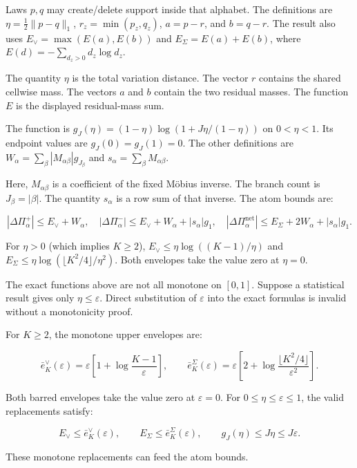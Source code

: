 \documentclass[
  11pt,
  a4paper,
]{article}
\begin{document}
Laws \(p,q\) may create/delete support inside that alphabet. The
definitions are \(\eta=\frac12\lVert p-q\rVert_1\),
\(r_z=\min(p_z,q_z)\), \(a=p-r\), and \(b=q-r\). The result also uses
\(E_\vee=\max(E(a),E(b))\) and \(E_\Sigma=E(a)+E(b)\), where
\(E(d)=-\sum_{d_z>0}d_z\log d_z\).

The quantity \(\eta\) is the total variation distance. The vector \(r\)
contains the shared cellwise mass. The vectors \(a\) and \(b\) contain
the two residual masses. The function \(E\) is the displayed
residual-mass sum.

The function is \(g_J(\eta)=(1-\eta)\log(1+J\eta/(1-\eta))\) on
\(0<\eta<1\). Its endpoint values are \(g_J(0)=g_J(1)=0\). The other
definitions are \(W_\alpha=\sum_\beta|M_{\alpha\beta}|g_{J_\beta}\) and
\(s_\alpha=\sum_\beta M_{\alpha\beta}\).

Here, \(M_{\alpha\beta}\) is a coefficient of the fixed Möbius inverse.
The branch count is \(J_\beta=|\beta|\). The quantity \(s_\alpha\) is a
row sum of that inverse. The atom bounds are:

\[
|\Delta\Pi_\alpha^+|\le E_\vee+W_\alpha,\quad
|\Delta\Pi_\alpha^-|\le E_\vee+W_\alpha+|s_\alpha|g_1,\quad
|\Delta\Pi_\alpha^{\mathrm{net}}|\le E_\Sigma+2W_\alpha+|s_\alpha|g_1.
\]

For \(\eta>0\) (which implies \(K\ge2\)),
\(E_\vee\le\eta\log((K-1)/\eta)\) and
\(E_\Sigma\le\eta\log(\lfloor K^2/4\rfloor/\eta^2)\). Both envelopes
take the value zero at \(\eta=0\).

The exact functions above are not all monotone on \([0,1]\). Suppose a
statistical result gives only \(\eta\le\varepsilon\). Direct
substitution of \(\varepsilon\) into the exact formulas is invalid
without a monotonicity proof.


For \(K\ge2\), the monotone upper envelopes are:

\[
\bar e_K^\vee(\varepsilon)
=\varepsilon\left[1+\log\frac{K-1}{\varepsilon}\right],
\qquad
\bar e_K^\Sigma(\varepsilon)
=\varepsilon\left[2+\log\frac{\lfloor K^2/4\rfloor}{\varepsilon^2}\right].
\]

Both barred envelopes take the value zero at \(\varepsilon=0\). For
\(0\le\eta\le\varepsilon\le1\), the valid replacements satisfy:

\[
E_\vee\le\bar e_K^\vee(\varepsilon),
\qquad
E_\Sigma\le\bar e_K^\Sigma(\varepsilon),
\qquad
g_J(\eta)\le J\eta\le J\varepsilon.
\]

These monotone replacements can feed the atom bounds.
\end{document}
